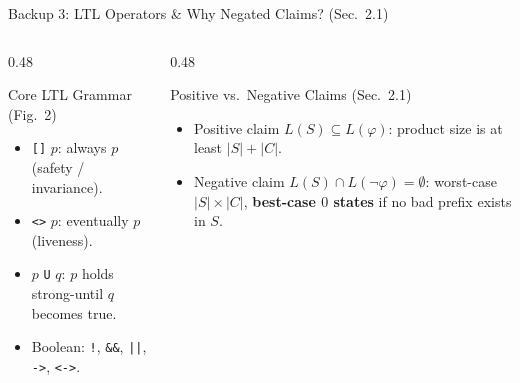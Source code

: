 \documentclass[aspectratio=169]{beamer}
\begin{document}
\begin{frame}[label=backup3]{Backup 3: LTL Operators \& Why Negated Claims? (Sec.\ 2.1)}
  \begin{columns}[T]
    \begin{column}{0.48\textwidth}
      \begin{block}{Core LTL Grammar (Fig.\ 2)}
        \begin{itemize}
          \item \texttt{[]} $p$: always $p$ (safety / invariance).
          \item \texttt{<>} $p$: eventually $p$ (liveness).
          \item $p$ \texttt{U} $q$: $p$ holds strong-until $q$ becomes true.
          \item Boolean: \texttt{!}, \texttt{\&\&}, \texttt{||}, \texttt{->}, \texttt{<->}.
        \end{itemize}
      \end{block}
    \end{column}
    \begin{column}{0.48\textwidth}
      \begin{block}{Positive vs.\ Negative Claims (Sec.\ 2.1)}
        \begin{itemize}
          \item Positive claim $L(S) \subseteq L(\varphi)$: product size is at least $|S| + |C|$.
          \item Negative claim $L(S) \cap L(\neg\varphi) = \emptyset$: worst-case $|S| \times |C|$, \textbf{best-case $0$ states} if no bad prefix exists in $S$.
        \end{itemize}
      \end{block}
    \end{column}
  \end{columns}
  \vspace{1.2em}
  \hfill\hyperlink{qa}{}
\end{frame}
\end{document}
